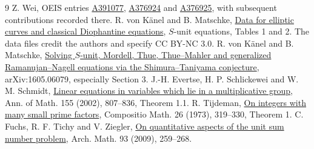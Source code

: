 \documentclass[11pt,letterpaper]{article}
\begin{document}
\begin{thebibliography}{9}\small
{} Z. Wei, OEIS entries \href{https://oeis.org/A391077}{A391077}, \href{https://oeis.org/A376924}{A376924} and \href{https://oeis.org/A376925}{A376925}, with subsequent contributions recorded there.
 R. von K\"anel and B. Matschke, \href{https://bmatschke.github.io/solving-classical-diophantine-equations/}{Data for elliptic curves and classical Diophantine equations}, $S$-unit equations, Tables 1 and 2. The data files credit the authors and specify CC BY-NC 3.0.
 R. von K\"anel and B. Matschke, \href{https://arxiv.org/abs/1605.06079}{Solving $S$-unit, Mordell, Thue, Thue--Mahler and generalized Ramanujan--Nagell equations via the Shimura--Taniyama conjecture}, arXiv:1605.06079, especially Section 3.
 J.-H. Evertse, H. P. Schlickewei and W. M. Schmidt, \href{https://doi.org/10.2307/3062133}{Linear equations in variables which lie in a multiplicative group}, Ann. of Math. 155 (2002), 807--836, Theorem 1.1.
 R. Tijdeman, \href{https://www.numdam.org/item/CM_1973__26_3_319_0/}{On integers with many small prime factors}, Compositio Math. 26 (1973), 319--330, Theorem 1.
 C. Fuchs, R. F. Tichy and V. Ziegler, \href{https://math.sbg.ac.at/fuchsc/publ/QuantUnits4.pdf}{On quantitative aspects of the unit sum number problem}, Arch. Math. 93 (2009), 259--268.
\end{thebibliography}
\end{document}

